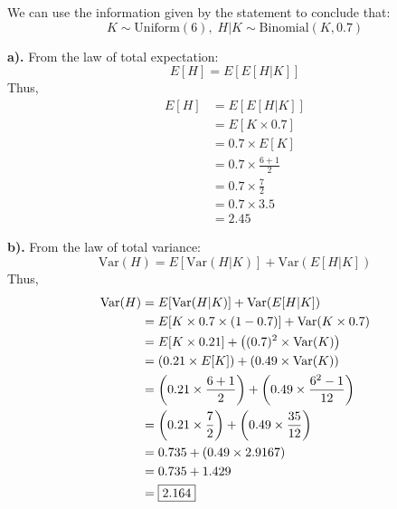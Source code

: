 \documentclass[a4paper, 10pt]{article}
\begin{document}
\begin{solution}
We can use the information given by the statement to conclude that:
\[
    K \sim \text{Uniform}(6), \; H | K \sim \text{Binomial}(K, 0.7)
\]
\par\noindent\textbf{a).} From the law of total expectation:
\[
    E[H] = E[E[H | K]]
\]
Thus,
\begin{align*}
    E[H] &= E[E[H | K]] \\
    &= E[K \times 0.7] \\
    &= 0.7 \times E[K] \\
    &= 0.7 \times \frac{6 + 1}{2} \\
    &= 0.7 \times \frac{7}{2} \\
    &= 0.7 \times 3.5 \\
    &= \boxed{2.45}
\end{align*}

\par\noindent\textbf{b).} From the law of total variance:
\[
    \text{Var}(H) = E[\text{Var}(H | K)] + \text{Var}(E[H | K])
\]
Thus,
\begin{align*}
    \text{Var}(H) &= E[\text{Var}(H | K)] + \text{Var}(E[H | K]) \\
    &= E[K \times 0.7 \times (1 - 0.7)] + \text{Var}(K \times 0.7) \\
    &= E[K \times 0.21] + \left((0.7)^2 \times \text{Var}(K)\right) \\
    &= \left(0.21 \times E[K]\right) + \left(0.49 \times \text{Var}(K)\right) \\
    &= \left(0.21 \times \frac{6 + 1}{2}\right) + \left(0.49 \times \frac{6^2 - 1}{12}\right) \\
    &= \left(0.21 \times \frac{7}{2}\right) + \left(0.49 \times \frac{35}{12}\right) \\
    &= 0.735 + \left(0.49 \times 2.9167\right) \\
    &= 0.735 + 1.429 \\
    &= \boxed{2.164}
\end{align*}
\end{solution}
\end{document}

